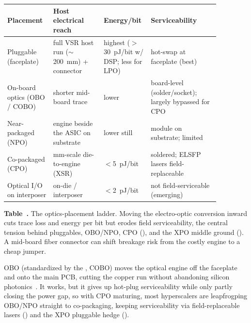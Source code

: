 \begin{table}[ht]
\label{tab:placement}%
\centering
\setlength{\tabcolsep}{5pt}%
\renewcommand{\arraystretch}{1.25}%
\begin{tabular}{@{}p{0.20\linewidth}p{0.22\linewidth}p{0.15\linewidth}p{0.30\linewidth}@{}}
\toprule
Placement & Host electrical reach & Energy/bit & Serviceability \\
\midrule
Pluggable (faceplate) & full VSR host run ($\sim$200~mm) + connector & highest ($>$30~pJ/bit w/ DSP; less for LPO) & hot-swap at faceplate (best) \\
\addlinespace[1.5em]
On-board optics (OBO / COBO) & shorter mid-board trace & lower & board-level (solder/socket); largely bypassed for CPO \\
\addlinespace[1.5em]
Near-packaged (NPO) & engine beside the ASIC on substrate & lower still & module on substrate; limited \\
\addlinespace[1.5em]
Co-packaged (CPO) & mm-scale die-to-engine (XSR) & $<$5~pJ/bit & soldered; ELSFP lasers field-replaceable \\
\addlinespace[1.5em]
Optical I/O on interposer & on-die / interposer & $<$2~pJ/bit & not field-serviceable (emerging) \\
\bottomrule
\end{tabular}
\par\medskip
{\raggedright\footnotesize\textbf{Table~\thetable.} The optics-placement ladder.
Moving the electro-optic conversion inward cuts trace loss and energy per bit but
erodes field serviceability, the central tension behind pluggables, OBO/NPO, CPO
(), and the XPO middle ground (). A mid-board
fiber connector can shift breakage risk from the costly engine to a cheap
jumper.\par}
\end{table}

 OBO (standardized
by the , COBO) moves the optical engine off the
faceplate and onto the main PCB, cutting the copper run without abandoning silicon
photonics~\cite{cobo}. It works, but it gives up hot-plug serviceability while only
partly closing the power gap, so with CPO maturing, most hyperscalers are leapfrog\-ping
OBO/NPO straight to co-packaging, keeping serviceability via field-replaceable lasers
() and the XPO pluggable hedge ().

